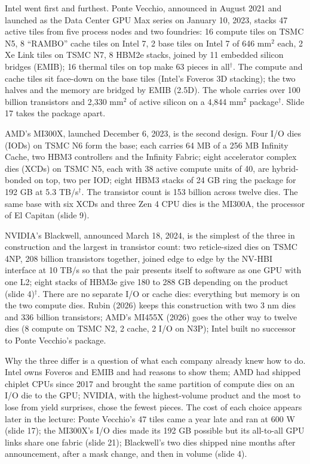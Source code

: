 \documentclass[11pt,letterpaper]{article}
\begin{document}
Intel went first and furthest. Ponte Vecchio, announced in August 2021 and launched as the Data Center GPU Max series on January 10, 2023, stacks 47 active tiles from five process nodes and two foundries: 16 compute tiles on TSMC N5, 8 ``RAMBO'' cache tiles on Intel 7, 2 base tiles on Intel 7 of 646 mm$^2$ each, 2 Xe Link tiles on TSMC N7, 8 HBM2e stacks, joined by 11 embedded silicon bridges (EMIB); 16 thermal tiles on top make 63 pieces in all$^\dagger$. The compute and cache tiles sit face-down on the base tiles (Intel's Foveros 3D stacking); the two halves and the memory are bridged by EMIB (2.5D). The whole carries over 100 billion transistors and 2{,}330 mm$^2$ of active silicon on a 4{,}844 mm$^2$ package$^\dagger$. Slide 17 takes the package apart.

AMD's MI300X, launched December 6, 2023, is the second design. Four I/O dies (IODs) on TSMC N6 form the base; each carries 64 MB of a 256 MB Infinity Cache, two HBM3 controllers and the Infinity Fabric; eight accelerator complex dies (XCDs) on TSMC N5, each with 38 active compute units of 40, are hybrid-bonded on top, two per IOD; eight HBM3 stacks of 24 GB ring the package for 192 GB at 5.3 TB/s$^\dagger$. The transistor count is 153 billion across twelve dies. The same base with six XCDs and three Zen 4 CPU dies is the MI300A, the processor of El Capitan (slide 9).

NVIDIA's Blackwell, announced March 18, 2024, is the simplest of the three in construction and the largest in transistor count: two reticle-sized dies on TSMC 4NP, 208 billion transistors together, joined edge to edge by the NV-HBI interface at 10 TB/s so that the pair presents itself to software as one GPU with one L2; eight stacks of HBM3e give 180 to 288 GB depending on the product (slide 4)$^\dagger$. There are no separate I/O or cache dies: everything but memory is on the two compute dies. Rubin (2026) keeps this construction with two 3 nm dies and 336 billion transistors; AMD's MI455X (2026) goes the other way to twelve dies (8 compute on TSMC N2, 2 cache, 2 I/O on N3P); Intel built no successor to Ponte Vecchio's package.

Why the three differ is a question of what each company already knew how to do. Intel owns Foveros and EMIB and had reasons to show them; AMD had shipped chiplet CPUs since 2017 and brought the same partition of compute dies on an I/O die to the GPU; NVIDIA, with the highest-volume product and the most to lose from yield surprises, chose the fewest pieces. The cost of each choice appears later in the lecture: Ponte Vecchio's 47 tiles came a year late and ran at 600 W (slide 17); the MI300X's I/O dies made its 192 GB possible but its all-to-all GPU links share one fabric (slide 21); Blackwell's two dies shipped nine months after announcement, after a mask change, and then in volume (slide 4).
\end{document}
